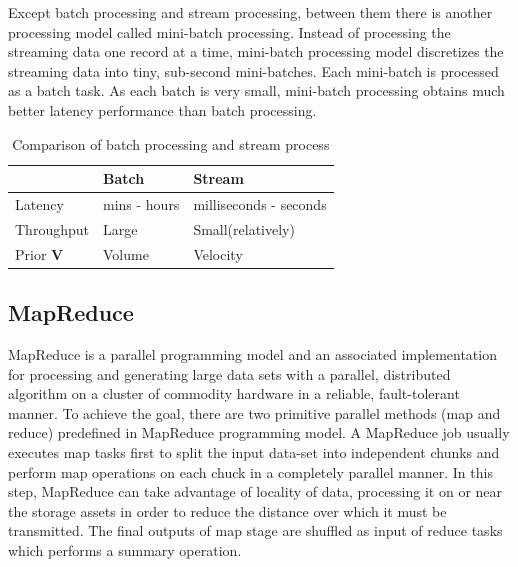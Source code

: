 Except batch processing and stream processing, between them there is another processing model called mini-batch processing. Instead of processing the streaming data one record at a time, mini-batch processing model discretizes the streaming data into tiny, sub-second mini-batches. Each mini-batch is processed as a batch task. As each batch is very small, mini-batch processing obtains much better latency performance than batch processing.

\begin{table}[H] %
\begin{tabular}{p{3.2cm} p{4.2cm} p{4.2cm}} 
\toprule %
  & Batch  & Stream \\ 
\hline 
 {\small Latency} & {\small mins - hours} & {\small milliseconds - seconds} \\
 {\small Throughput} & {\small Large} & {\small Small(relatively)}\\
 {\small Prior \textbf{V}} & {\small Volume} & {\small Velocity}\\   
\bottomrule
\end{tabular} %
\caption{Comparison of batch processing and stream process} 
\label{table:BatchVSStream}
\end{table}

\subsection{MapReduce}
MapReduce is a parallel programming model and an associated implementation for processing and generating large data sets with a parallel, distributed algorithm on a cluster  of commodity hardware in a reliable, fault-tolerant manner\cite{dean2008mapreduce}. To achieve the goal, there are two primitive parallel methods (map and reduce) predefined in MapReduce programming model. A MapReduce job usually executes map tasks first to split the input data-set into independent chunks and perform map operations on each chuck in a completely parallel manner. In this step,  MapReduce can take advantage of locality of data, processing it on or near the storage assets in order to reduce the distance over which it must be transmitted. The final outputs of map stage are shuffled as input of reduce tasks which performs a summary operation. 

